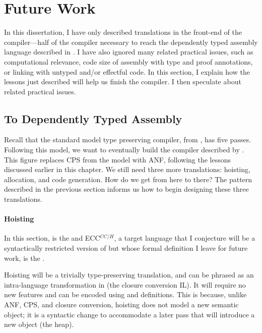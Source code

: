 \section{Future Work}
In this dissertation, I have only described translations in the front-end of the
compiler---half of the compiler necessary to reach the dependently typed
assembly language described in .
I have also ignored many related practical issues, such as computational
relevance, code size of assembly with type and proof annotations, or linking
with untyped and/or effectful code.
In this section, I explain how the lessons just described will help us finish
the compiler.
I then speculate about related practical issues.

\subsection{To Dependently Typed Assembly}
\FigFutureDiagram
Recall that the standard model type preserving compiler,
 from , has five
passes.
Following this model, we want to eventually build the compiler described by
.
This figure replaces CPS from the model with ANF, following the lessons
discussed earlier in this chapter.
We still need three more translations: hoisting, allocation, and code
generation.
How do we get from here to there?
The pattern described in the previous section informs us how to begin designing
these three translations.

\paragraph{Hoisting}
\begin{typographical}
  In this section, \abscctlang is the  and
  ECC$^{CC/H}$, a target language that I conjecture will be a
  syntactically restricted version of \abscctlang but whose formal definition I
  leave for future work, is the .
\end{typographical}

Hoisting will be a trivially type-preserving translation, and can be phrased as
an intra-language transformation in \abscctlang (the closure conversion IL).
It will require no new features and can be encoded using  and
definitions.
This is because, unlike ANF, CPS, and closure conversion, hoisting does not
model a new semantic object; it is a syntactic change to accommodate a later
pass that will introduce a new object (the heap).

